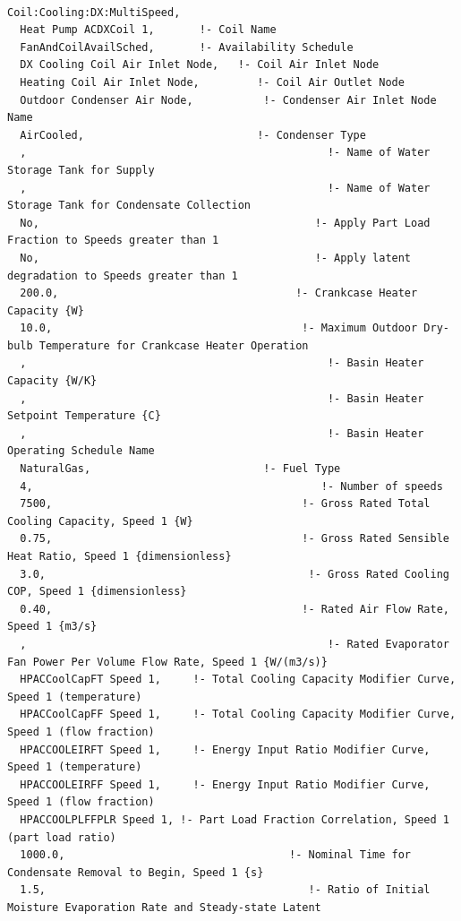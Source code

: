\begin{lstlisting}

Coil:Cooling:DX:MultiSpeed,
  Heat Pump ACDXCoil 1,       !- Coil Name
  FanAndCoilAvailSched,       !- Availability Schedule
  DX Cooling Coil Air Inlet Node,   !- Coil Air Inlet Node
  Heating Coil Air Inlet Node,         !- Coil Air Outlet Node
  Outdoor Condenser Air Node,           !- Condenser Air Inlet Node Name
  AirCooled,                           !- Condenser Type
  ,                                               !- Name of Water Storage Tank for Supply
  ,                                               !- Name of Water Storage Tank for Condensate Collection
  No,                                           !- Apply Part Load Fraction to Speeds greater than 1
  No,                                           !- Apply latent degradation to Speeds greater than 1
  200.0,                                     !- Crankcase Heater Capacity {W}
  10.0,                                       !- Maximum Outdoor Dry-bulb Temperature for Crankcase Heater Operation
  ,                                               !- Basin Heater Capacity {W/K}
  ,                                               !- Basin Heater Setpoint Temperature {C}
  ,                                               !- Basin Heater Operating Schedule Name
  NaturalGas,                           !- Fuel Type
  4,                                             !- Number of speeds
  7500,                                       !- Gross Rated Total Cooling Capacity, Speed 1 {W}
  0.75,                                       !- Gross Rated Sensible Heat Ratio, Speed 1 {dimensionless}
  3.0,                                         !- Gross Rated Cooling COP, Speed 1 {dimensionless}
  0.40,                                       !- Rated Air Flow Rate, Speed 1 {m3/s}
  ,                                               !- Rated Evaporator Fan Power Per Volume Flow Rate, Speed 1 {W/(m3/s)}
  HPACCoolCapFT Speed 1,     !- Total Cooling Capacity Modifier Curve, Speed 1 (temperature)
  HPACCoolCapFF Speed 1,     !- Total Cooling Capacity Modifier Curve, Speed 1 (flow fraction)
  HPACCOOLEIRFT Speed 1,     !- Energy Input Ratio Modifier Curve, Speed 1 (temperature)
  HPACCOOLEIRFF Speed 1,     !- Energy Input Ratio Modifier Curve, Speed 1 (flow fraction)
  HPACCOOLPLFFPLR Speed 1, !- Part Load Fraction Correlation, Speed 1 (part load ratio)
  1000.0,                                   !- Nominal Time for Condensate Removal to Begin, Speed 1 {s}
  1.5,                                         !- Ratio of Initial Moisture Evaporation Rate and Steady-state Latent

\end{lstlisting}
